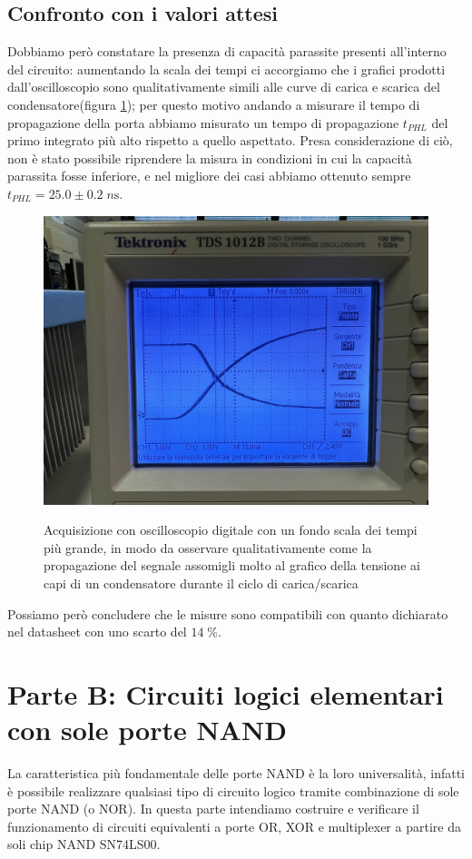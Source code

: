 \documentclass[10pt, a4paper, italian]{article}
\begin{document}
\subsection{Confronto con i valori attesi}
Dobbiamo però constatare la presenza di capacità parassite presenti all'interno del circuito: aumentando la scala dei tempi ci accorgiamo che i grafici prodotti dall'oscilloscopio sono qualitativamente simili alle curve di carica e scarica del condensatore(figura \cref{fig: carica}); per questo motivo andando a misurare il tempo di propagazione della porta abbiamo misurato un tempo di propagazione $t_{PHL}$ del primo integrato più alto rispetto a quello aspettato. Presa considerazione di ciò, non è stato possibile riprendere la misura in condizioni in cui la capacità parassita fosse inferiore, e nel migliore dei casi abbiamo ottenuto sempre $t_{PHL}=25.0 \pm 0.2 \; \si{n\s}$.
\begin{figure}[htbp]
\centering
	\includegraphics[width=\textwidth]{carica}
	\label{fig: carica}
	\caption{Acquisizione con oscilloscopio digitale con un fondo scala dei tempi più grande, in modo da osservare qualitativamente come la propagazione del segnale assomigli molto al grafico della tensione ai capi di un condensatore durante il ciclo di carica/scarica}
\end{figure}
Possiamo però concludere che le misure sono compatibili con quanto dichiarato nel datasheet con uno scarto del $14 \; \percent$.

\setcounter{section}{3}
\section*{Parte B: Circuiti logici elementari con sole porte NAND}
La caratteristica più fondamentale delle porte NAND è la loro universalità,
infatti è possibile realizzare qualsiasi tipo di circuito logico tramite
combinazione di sole porte NAND (o NOR). In questa parte intendiamo costruire
e verificare il funzionamento di circuiti equivalenti a porte OR, XOR e
multiplexer a partire da soli chip NAND SN74LS00.
\end{document}
